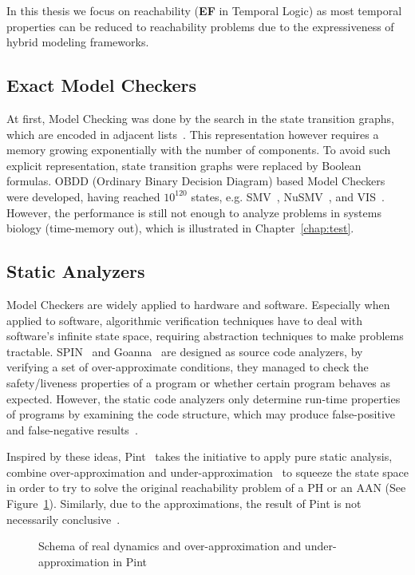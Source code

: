 In this thesis we focus on reachability (\textbf{EF} in Temporal Logic) as most temporal properties can be reduced to reachability problems due to the expressiveness of hybrid modeling frameworks.

\subsection{Exact Model Checkers}
At first, Model Checking was done by the search in the state transition graphs, which are encoded in adjacent lists~\cite{clarke1981design}.
This representation however requires a memory growing exponentially with the number of components.
To avoid such explicit representation, state transition graphs were replaced by Boolean formulas.
OBDD (Ordinary Binary Decision Diagram) based Model Checkers were developed, having reached $10^{120}$ states, e.g.
SMV~\cite{mcmillan1993symbolic}, NuSMV~\cite{cimatti2000nusmv}, and VIS~\cite{brayton1996vis}.
However, the performance is still not enough to analyze problems in systems biology (time-memory out), which is illustrated in Chapter~\ref{chap:test}.  

\subsection{Static Analyzers}
Model Checkers are widely applied to hardware and software.
Especially when applied to software, algorithmic verification techniques have
to deal with software’s infinite state space, requiring abstraction techniques to make problems tractable.
SPIN~\cite{holzmann1997model} and Goanna~\cite{fehnker2006goanna} are designed as source code analyzers, by verifying a set of over-approximate conditions, they managed to check the safety/liveness properties of a program or whether certain program behaves as expected. 
However, the static code analyzers only determine run-time properties of programs by examining the code structure, which may produce false-positive and false-negative results~\cite{vorobyov2010comparing}.

Inspired by these ideas, Pint~\cite{Pint} takes the initiative to apply pure static analysis, combine over-approximation and under-approximation~\cite{pauleve2012} to squeeze the state space in order to try to solve the original reachability problem of a PH or an AAN (See Figure~\ref{fig:vennDiagram}).
Similarly, due to the approximations, the result of Pint is not necessarily conclusive~\cite{folschette2015}.

\begin{figure}[ht]
    \centering
    
    \caption[Static analysis]{Schema of real dynamics and over-approximation and under-approximation in Pint}
    \label{fig:vennDiagram}
\end{figure}

